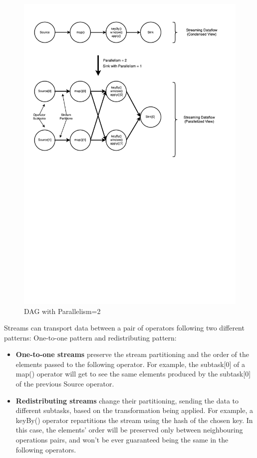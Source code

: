 \begin{figure}[!htb]
    \centering
    \includegraphics[scale=0.75, trim=0.5cm 12cm 1cm 0.5cm]{Figures/parallel_dataflow.pdf}
    \decoRule
    \caption[Parallel Dataflow]{DAG with Parallelism=2}
    \label{fig:ParallelDataflow}
\end{figure}

Streams can transport data between a pair of operators following two different patterns: One-to-one pattern and redistributing pattern:
\begin{itemize}
	\item \textbf{One-to-one streams} preserve the stream partitioning and the order of the elements passed to the following operator. For example, the subtask[0] of a map() operator will get to see the same elements produced by the subtask[0] of the previous Source operator.
   
    \item \textbf{Redistributing streams} change their partitioning, sending the data to different subtasks, based on the transformation being applied. For example, a keyBy() operator repartitions the stream using the hash of the chosen key. In this case, the elements' order will be preserved only between neighbouring operations pairs, and won't be ever guaranteed being the same in the following operators.
\end{itemize}

